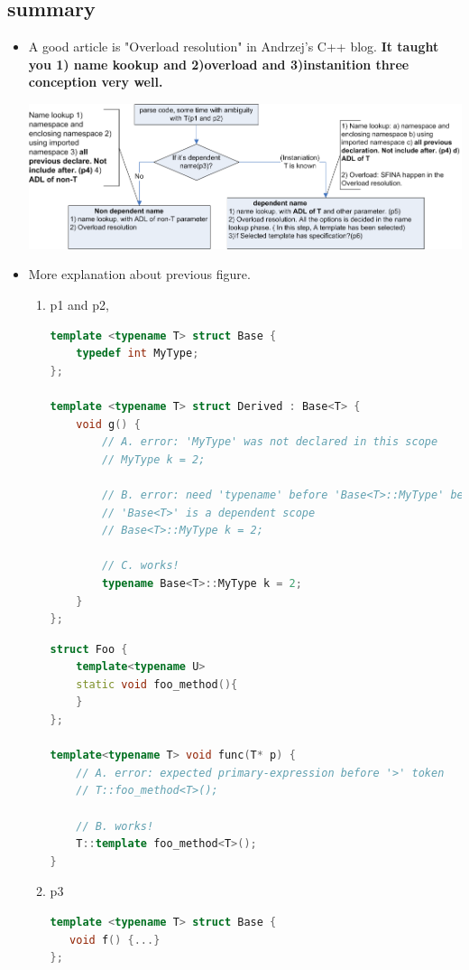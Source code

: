 \documentclass[a4paper,11pt,twoside]{book}
\begin{document}
\subsection{summary}
\begin{itemize}
\item A good article is "Overload resolution" in Andrzej's C++ blog. \textbf{It taught you 1) name kookup and 2)overload and 3)instanition three conception very well.}


\includegraphics[scale=0.8]{pics/template.png}

\item More explanation about previous figure.
\begin{enumerate}
\item p1 and p2, 
\begin{lstlisting}[frame=single, language=c++]
template <typename T> struct Base {
	typedef int MyType;
};

template <typename T> struct Derived : Base<T> {
	void g() {
		// A. error: 'MyType' was not declared in this scope
		// MyType k = 2;

		// B. error: need 'typename' before 'Base<T>::MyType' because
		// 'Base<T>' is a dependent scope
		// Base<T>::MyType k = 2;

		// C. works!
		typename Base<T>::MyType k = 2;
	}
};
\end{lstlisting}

\begin{lstlisting}[frame=single, language=c++]
struct Foo {
	template<typename U>
	static void foo_method(){
	}
};

template<typename T> void func(T* p) {
	// A. error: expected primary-expression before '>' token
	// T::foo_method<T>();

	// B. works!
	T::template foo_method<T>();
}
\end{lstlisting}

\item p3
\begin{lstlisting}[frame=single, language=c++]
template <typename T> struct Base {
   void f() {...}
};


\end{lstlisting}
\end{enumerate}
\end{itemize}
\end{document}
